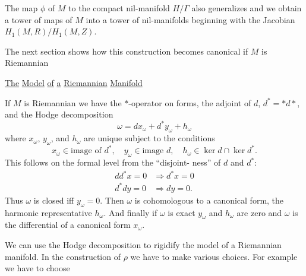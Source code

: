 The map $\phi$ of $M$ to the compact nil-manifold $H/\Gamma$
also generalizes and we obtain a tower of maps of $M$
into a tower of nil-manifolds beginning with the Jacobian
$H_1(M,R)/H_1(M,Z)$.

The next section shows how this construction becomes
canonical if $M$ is Riemannian

\begin{center}\uline{The} \uline{Model} \uline{of} \uline{a} \uline{Riemannian} \uline{Manifold}\end{center}

If $M$ is Riemannian we have the $*$-operator on forms,
the adjoint of $d$, $d^*=*d*$, and the Hodge decomposition
\[
\omega=dx_\omega+d^*y_\omega+h_\omega
\]
where $x_\omega$, $y_\omega$, and $h_\omega$ are unique subject to the conditions
\[
x_\omega\in\text{image of }d^*,\quad y_\omega\in\text{image }d,\quad
h_\omega\in\ker d\cap\ker d^*.
\]
This follows on the formal level from the ``disjoint-
ness'' of $d$ and $d^*$:
\[
\begin{aligned}
dd^*x=0&\Rightarrow d^*x=0\\
d^*dy=0&\Rightarrow dy=0.
\end{aligned}
\]
Thus $\omega$ is closed iff $y_\omega=0$. Then $\omega$ is cohomologous
to a canonical form, the harmonic representative $h_\omega$.
And finally if $\omega$ is exact $y_\omega$ and $h_\omega$ are zero and $\omega$ is the
differential of a canonical form $x_\omega$.

We can use the Hodge decomposition to rigidify the
model of a Riemannian manifold. In the construction of
$\rho$
we have to make various choices. For example we have to
choose

